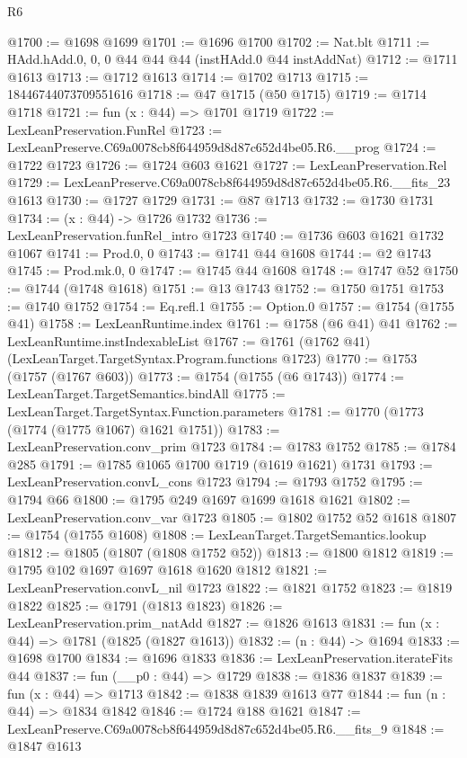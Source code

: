 \begin{lexlean}{R6}
\begin{coremodule}
@1700 := @1698 @1699
@1701 := @1696 @1700
@1702 := Nat.blt
@1711 := HAdd.hAdd.{0, 0, 0} @44 @44 @44 (instHAdd.{0} @44 instAddNat)
@1712 := @1711 @1613
@1713 := @1712 @1613
@1714 := @1702 @1713
@1715 := 18446744073709551616
@1718 := @47 @1715 (@50 @1715)
@1719 := @1714 @1718
@1721 := fun (x : @44) => @1701 @1719
@1722 := LexLeanPreservation.FunRel
@1723 := LexLeanPreserve.C69a0078cb8f644959d8d87c652d4be05.R6.__prog
@1724 := @1722 @1723
@1726 := @1724 @603 @1621
@1727 := LexLeanPreservation.Rel
@1729 := LexLeanPreserve.C69a0078cb8f644959d8d87c652d4be05.R6.__fits_23 @1613
@1730 := @1727 @1729
@1731 := @87 @1713
@1732 := @1730 @1731
@1734 := (x : @44) -> @1726 @1732
@1736 := LexLeanPreservation.funRel_intro @1723
@1740 := @1736 @603 @1621 @1732 @1067
@1741 := Prod.{0, 0}
@1743 := @1741 @44 @1608
@1744 := @2 @1743
@1745 := Prod.mk.{0, 0}
@1747 := @1745 @44 @1608
@1748 := @1747 @52
@1750 := @1744 (@1748 @1618)
@1751 := @13 @1743
@1752 := @1750 @1751
@1753 := @1740 @1752
@1754 := Eq.refl.{1}
@1755 := Option.{0}
@1757 := @1754 (@1755 @41)
@1758 := LexLeanRuntime.index
@1761 := @1758 (@6 @41) @41
@1762 := LexLeanRuntime.instIndexableList
@1767 := @1761 (@1762 @41) (LexLeanTarget.TargetSyntax.Program.functions @1723)
@1770 := @1753 (@1757 (@1767 @603))
@1773 := @1754 (@1755 (@6 @1743))
@1774 := LexLeanTarget.TargetSemantics.bindAll
@1775 := LexLeanTarget.TargetSyntax.Function.parameters
@1781 := @1770 (@1773 (@1774 (@1775 @1067) @1621 @1751))
@1783 := LexLeanPreservation.conv_prim @1723
@1784 := @1783 @1752
@1785 := @1784 @285
@1791 := @1785 @1065 @1700 @1719 (@1619 @1621) @1731
@1793 := LexLeanPreservation.convL_cons @1723
@1794 := @1793 @1752
@1795 := @1794 @66
@1800 := @1795 @249 @1697 @1699 @1618 @1621
@1802 := LexLeanPreservation.conv_var @1723
@1805 := @1802 @1752 @52 @1618
@1807 := @1754 (@1755 @1608)
@1808 := LexLeanTarget.TargetSemantics.lookup
@1812 := @1805 (@1807 (@1808 @1752 @52))
@1813 := @1800 @1812
@1819 := @1795 @102 @1697 @1697 @1618 @1620 @1812
@1821 := LexLeanPreservation.convL_nil @1723
@1822 := @1821 @1752
@1823 := @1819 @1822
@1825 := @1791 (@1813 @1823)
@1826 := LexLeanPreservation.prim_natAdd
@1827 := @1826 @1613
@1831 := fun (x : @44) => @1781 (@1825 (@1827 @1613))
@1832 := (n : @44) -> @1694
@1833 := @1698 @1700
@1834 := @1696 @1833
@1836 := LexLeanPreservation.iterateFits @44
@1837 := fun (__p0 : @44) => @1729
@1838 := @1836 @1837
@1839 := fun (x : @44) => @1713
@1842 := @1838 @1839 @1613 @77
@1844 := fun (n : @44) => @1834 @1842
@1846 := @1724 @188 @1621
@1847 := LexLeanPreserve.C69a0078cb8f644959d8d87c652d4be05.R6.__fits_9
@1848 := @1847 @1613

\end{coremodule}
\end{lexlean}
